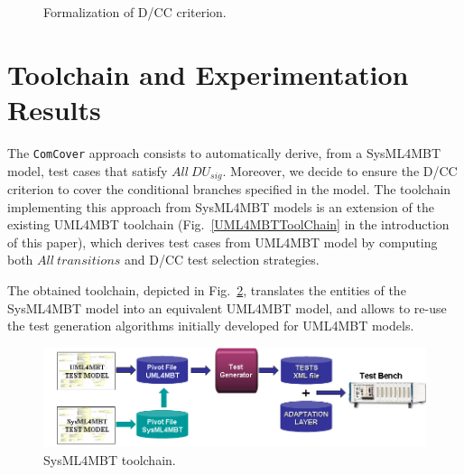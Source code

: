 \documentclass{llncs}
\begin{document}
\begin{figure}[htp]
\vspace*{-.25cm}
\begin{center}
\begin{scriptsize}
\end{scriptsize}
\vspace*{-.2cm}
\caption{Formalization of D/CC criterion.}
\label{formalDCC}
\end{center}
\vspace*{-1.2cm}
\end{figure}

\section{Toolchain and Experimentation Results}
\label{tool}
\vspace*{-.25cm}
The \texttt{ComCover} approach consists to automatically derive, from a
SysML4MBT model, test cases that satisfy $All~DU_{sig}$. Moreover, we
decide to ensure the D/CC criterion to cover the conditional branches
specified in the model. The toolchain implementing this approach from
SysML4MBT models is an extension of the existing UML4MBT toolchain
(Fig.~\ref{UML4MBTToolChain} in the introduction of this paper),
which derives test cases from UML4MBT model by computing both
$All~transitions$ and D/CC test selection strategies. 

The obtained
toolchain, depicted in Fig.~\ref{newToolChain}, translates the
entities of the SysML4MBT model into an equivalent UML4MBT model, and
allows to re-use the test generation algorithms
initially developed for UML4MBT models.
\vspace*{-.25cm}
\begin{figure}[htp]
	\centering
	\includegraphics[width=\columnwidth]{./img/newToolChain.png}
        \caption{SysML4MBT toolchain.}
	\label{newToolChain}
\vspace*{-.35cm}
\end{figure}
\end{document}
